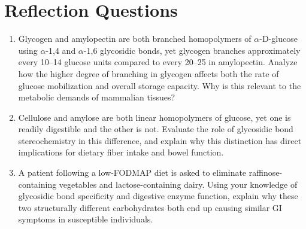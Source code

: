 \documentclass{tufte-handout}
\begin{document}

\section{Reflection Questions}
\begin{enumerate}
\item Glycogen and amylopectin are both branched homopolymers of $\alpha$-D-glucose using $\alpha$-1,4 and $\alpha$-1,6 glycosidic bonds, yet glycogen branches approximately every 10--14 glucose units compared to every 20--25 in amylopectin. Analyze how the higher degree of branching in glycogen affects both the rate of glucose mobilization and overall storage capacity. Why is this relevant to the metabolic demands of mammalian tissues?
\item Cellulose and amylose are both linear homopolymers of glucose, yet one is readily digestible and the other is not. Evaluate the role of glycosidic bond stereochemistry in this difference, and explain why this distinction has direct implications for dietary fiber intake and bowel function.
\item A patient following a low-FODMAP diet is asked to eliminate raffinose-containing vegetables and lactose-containing dairy. Using your knowledge of glycosidic bond specificity and digestive enzyme function, explain why these two structurally different carbohydrates both end up causing similar GI symptoms in susceptible individuals.
\end{enumerate}



\end{document}
